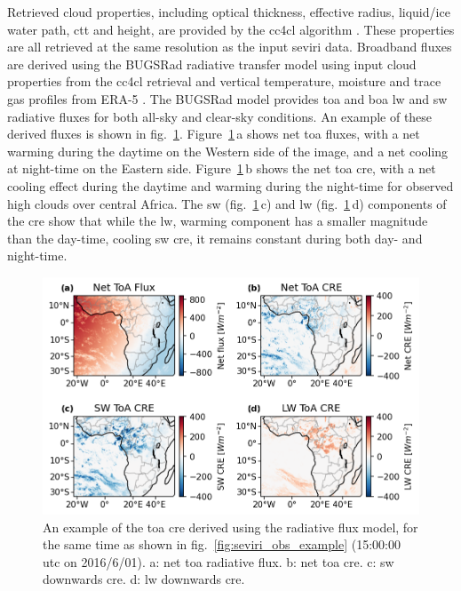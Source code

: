 Retrieved cloud properties, including optical thickness, effective radius, liquid/ice water path, \acrshort{ctt} and height, are provided by the \acrfull{cc4cl} algorithm \citep{sus_community_2018, mcgarragh_community_2018}. 
These properties are all retrieved at the same resolution as the input \acrshort{seviri} data. Broadband fluxes are derived using the BUGSRad radiative transfer model \citep{stephens_parameterization_2001} using input cloud properties from the \acrshort{cc4cl} retrieval and vertical temperature, moisture and trace gas profiles from ERA-5 \citep{hersbach_era5_2020}. 
The BUGSRad model provides \acrshort{toa} and \acrlong{boa} \acrshort{lw} and \acrshort{sw} radiative fluxes for both all-sky and clear-sky conditions. An example of these derived fluxes is shown in fig.~\ref{fig:seviri_flux_example}. 
Figure~\ref{fig:seviri_flux_example}\,a shows net \acrshort{toa} fluxes, with a net warming during the daytime on the Western side of the image, and a net cooling at night-time on the Eastern side. 
Figure~\ref{fig:seviri_flux_example}\,b shows the net \acrshort{toa} \acrshort{cre}, with a net cooling effect during the daytime and warming during the night-time for observed high clouds over central Africa. The \acrshort{sw} (fig.~\ref{fig:seviri_flux_example}\,c) and \acrshort{lw} (fig.~\ref{fig:seviri_flux_example}\,d) components of the \acrshort{cre} show that while the \acrshort{lw},
warming component has a smaller magnitude than the day-time, cooling \acrshort{sw} \acrshort{cre}, it remains constant during both day- and night-time.


\begin{figure}[tp]
    \includegraphics[width=\textwidth]{figures/ch3_02.png}
    \caption[
    An example of the \acrshort{toa} \acrshort{cre} derived using the radiative flux model
    ]{
    An example of the \acrshort{toa} \acrshort{cre} derived using the radiative flux model, for the same time
    as shown in fig.~\ref{fig:seviri_obs_example} (15:00:00 \acrshort{utc} on 2016/6/01). a: net \acrshort{toa} radiative flux. b: net \acrshort{toa} \acrshort{cre}. c: \acrshort{sw} downwards \acrshort{cre}. d: \acrshort{lw} downwards \acrshort{cre}.
    }
    \label{fig:seviri_flux_example}
\end{figure}


